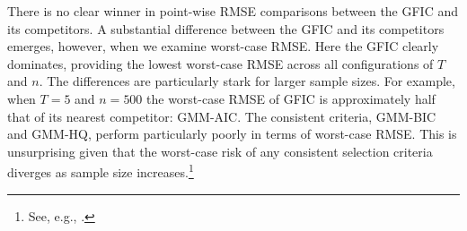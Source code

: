 There is no clear winner in point-wise RMSE comparisons between the GFIC and its competitors. 
A substantial difference between the GFIC and its competitors emerges, however, when we examine worst-case RMSE.
Here the GFIC clearly dominates, providing the lowest worst-case RMSE across all configurations of $T$ and $n$.
The differences are particularly stark for larger sample sizes.
For example, when $T=5$ and $n=500$ the worst-case RMSE of GFIC is approximately half that of its nearest competitor: GMM-AIC.
The consistent criteria, GMM-BIC and GMM-HQ, perform particularly poorly in terms of worst-case RMSE.
This is unsurprising given that the worst-case risk of any consistent selection criteria diverges as sample size increases.\footnote{See, e.g., \cite{LeebPoetscher2008}.}

